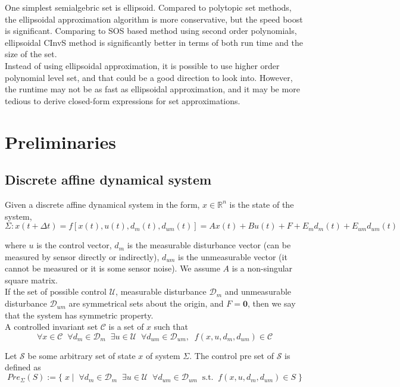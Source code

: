 \documentclass{article}
\begin{document}
One simplest semialgebric set is ellipsoid. Compared to polytopic set methods, the ellipsoidal approximation algorithm is more conservative, but the speed boost is significant. Comparing to SOS based method using second order polynomials, ellipsoidal CInvS method is significantly better in terms of both run time and the size of the set.\\

Instead of using ellipsoidal approximation, it is possible to use higher order polynomial level set, and that could be a good direction to look into. However, the runtime may not be as fast as ellipsoidal approximation, and it may be more tedious to derive closed-form expressions for set approximations.

\section{Preliminaries}

\subsection{Discrete affine dynamical system}
Given a discrete affine dynamical system in the form, $x \in \mathbb{R}^n$ is the state of the system,
$$
\Sigma: x(t+\Delta t) = f[x(t), u(t), d_m(t), d_{um}(t)] =  Ax(t) + Bu(t) + F + E_m d_m(t) + E_{um} d_{um}(t)
$$

where $u$ is the control vector, $d_m$ is the measurable disturbance vector (can be measured by sensor directly or indirectly), $d_{um}$ is the unmeasurable vector (it cannot be measured or it is some sensor noise). We assume $A$ is a non-singular square matrix.\\

If the set of possible control $\mathcal U$, measurable disturbance $\mathcal D_m$ and unmeasurable disturbance $\mathcal D_{um}$ are symmetrical sets about the origin, and $F = \mathbf{0}$,  then we say that the system has symmetric property. \\

A controlled invariant set $\mathcal C$ is a set of $x$ such that
$$
\forall x \in \mathcal C \;\; \forall d_m \in \mathcal D_m \;\; \exists u \in \mathcal  U\;\; \forall d_{um} \in \mathcal D_{um}, \;\;  f(x, u, d_m, d_{um}) \in \mathcal C
$$

Let $\mathcal S$ be some arbitrary set of state $x$ of system $\Sigma$. The control pre set of $\mathcal S$ is defined as 
\begin{equation}
Pre_{\Sigma}(S) := \{\; x \; | \;\;\forall d_m \in \mathcal{D}_m \;\; \exists u \in \mathcal U\;\; \forall d_{um} \in \mathcal D_{um} \;\; \text{s.t.} \;\;  f(x, u, d_m, d_{um}) \in S\;\}
\label{control-pre-def}
\end{equation}
\end{document}
